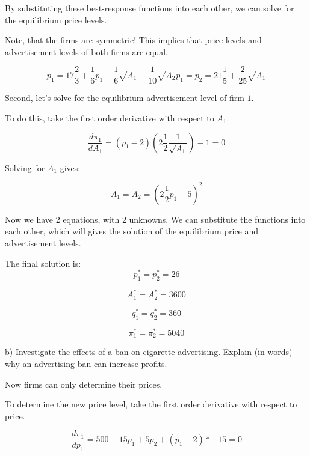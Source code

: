 \documentclass[12pt,english]{article}%
\begin{document}
By substituting these best-response functions into each other, we can solve for the equilibrium price levels. 

Note, that the firms are symmetric! This implies that price levels and advertisement levels of both firms are equal. 

\begin{equation}
p_1=17\frac{2}{3}+\frac{1}{6}p_1+\frac{1}{6}\sqrt{A_1}-\frac{1}{10}\sqrt{A_2}
p_1=p_2=21\frac{1}{5}+\frac{2}{25}\sqrt{A_1}
\end{equation}

Second, let's solve for the equilibrium advertisement level of firm $1$.

To do this, take the first order derivative with respect to $A_1$.

\begin{equation}
\frac{d\pi_1}{dA_1}=(p_1-2)(2\frac{1}{2}\frac{1}{\sqrt{A_1}})-1=0
\end{equation}

Solving for $A_1$ gives:

\begin{equation}
A_1=A_2=(2\frac{1}{2}p_1-5)^2
\end{equation}

Now we have 2 equations, with 2 unknowns. We can substitute the functions into each other, which will gives the solution of the equilibrium price and advertisement levels. 

The final solution is:
\begin{equation}
p_1^*=p_2^*=26
\end{equation}

\begin{equation}
A_1^*=A_2^*=3600
\end{equation}

\begin{equation}
q_1^*=q_2^*=360
\end{equation}

\begin{equation}
\pi_1^*=\pi_2^*=5040
\end{equation}

b) Investigate the effects of a ban on cigarette advertising. Explain (in words) why an advertising ban can increase profits. 

Now firms can only determine their prices. 

To determine the new price level, take the first order derivative with respect to price. 

\begin{equation}
\frac{d\pi_1}{dp_1}=500-15p_1+5p_2+(p_1-2)*-15=0
\end{equation}
\end{document}
